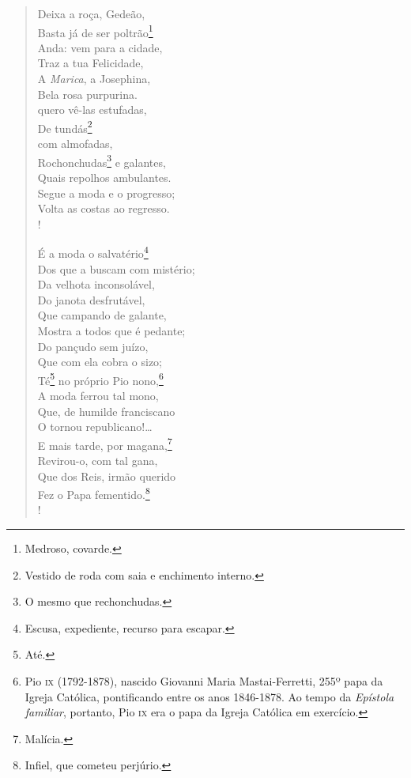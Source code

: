 \begin{verse}
Deixa a roça, Gedeão,\\
Basta já de ser poltrão\footnote{ Medroso, covarde.}\\
Anda: vem para a cidade,\\
Traz a tua Felicidade,\\
A \emph{Marica}, a Josephina,\\
Bela rosa purpurina.\\
quero vê-las estufadas,\\
De tundás\footnote{ Vestido de roda com saia e enchimento interno.}\\
com almofadas,\\
Rochonchudas\footnote{ O mesmo que rechonchudas.} e galantes,\\
Quais repolhos ambulantes.\\
Segue a moda e o progresso;\\
Volta as costas ao regresso.\\!

É a moda o salvatério\footnote{ Escusa, expediente, recurso para escapar.}\\
Dos que a buscam com mistério;\\
Da velhota inconsolável,\\
Do janota desfrutável,\\
Que campando de galante,\\
Mostra a todos que é pedante;\\
Do pançudo sem juízo,\\
Que com ela cobra o sizo;\\
Té\footnote{ Até.} no próprio Pio nono,\footnote{ Pio \textsc{ix} (1792-1878), 
                      nascido Giovanni Maria Mastai-Ferretti, 255º papa da
                      Igreja Católica, pontificando entre os anos 1846-1878. Ao tempo da
                      \emph{Epístola familiar}, portanto, Pio \textsc{ix} era o papa da Igreja
                      Católica em exercício.}\\
A moda ferrou tal mono,\\
Que, de humilde franciscano\\
O tornou republicano!\ldots{}\\
E mais tarde, por magana,\footnote{ Malícia.}\\
Revirou-o, com tal gana,\\
Que dos Reis, irmão querido\\
Fez o Papa fementido.\footnote{ Infiel, que cometeu perjúrio.}\\!


\end{verse}
